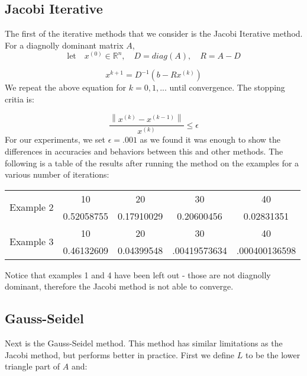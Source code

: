 \documentclass[11pt]{article}	%
\newcommand\norm[1]{\left\lVert#1\right\rVert}
\begin{document}
\subsection{Jacobi Iterative}
    The first of the iterative methods that we consider is the Jacobi Iterative method. For a diagnolly dominant matrix $A$,
    \begin{equation}\label{eq:jacobi-eq-1-qualifier}
        \textrm{let} \quad x^{(0)}\in {\mathbb R}^n,\quad D = diag(A),\quad R = A - D
    \end{equation}

    \begin{equation}\label{eq:jacobi-eq-1}
        x^{k+1} = D^{-1}(b- Rx^{(k)})
    \end{equation}
    We repeat the above equation for $k = 0, 1, ...$ until convergence. The stopping critia is:

    \begin{equation}
        \frac{\norm{x^{(k)} - x^{(k-1)}}}{x^{(k)}} \leq \epsilon
    \end{equation}
    For our experiments, we set $\epsilon = .001$ as we found it was enough to show the differences in accuracies and behaviors between this and other methods. The following is a table of the results after running the method on the examples for a various number of iterations:
    \begin{center}
        \begin{tabular}{||c|c|c|c|c||}
            \hline
            \multirow{2}{5em}{Example 2} & 10 & 20 & 30 & 40 \\ [.25em]
            & 0.52058755 & 0.17910029 & 0.20600456 & 0.02831351 \\ [.25em]
            \hline \hline
            \multirow{2}{5em}{Example 3} & 10 & 20 & 30 & 40 \\ [.25em]
            & 0.46132609 & 0.04399548 & .00419573634 & .000400136598 \\ [.25em]
            \hline
        \end{tabular}
    \end{center}

    Notice that examples 1 and 4 have been left out - those are not diagnolly dominant, therefore the Jacobi method
    is not able to converge.

\subsection{Gauss-Seidel}
Next is the Gauss-Seidel method. This method has similar limitations as the Jacobi method, but performs better in practice.
First we define $L$ to be the lower triangle part of $A$ and:
\end{document}
